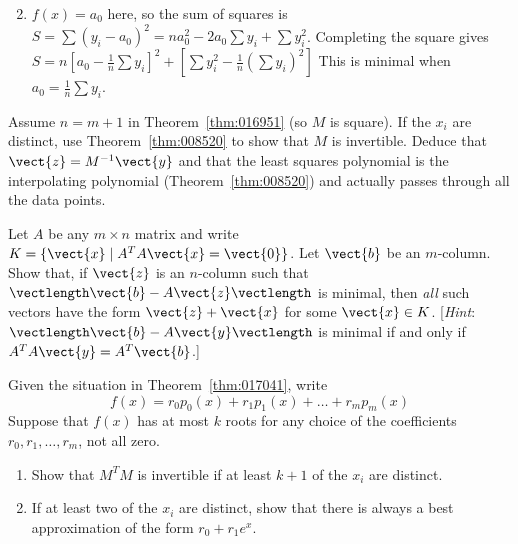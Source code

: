 \begin{multicols}{2}
\begin{ex}
\begin{enumerate}[label={\alph*.}]
\end{enumerate}
\begin{sol}
\begin{enumerate}[label={\alph*.}]
\setcounter{enumi}{1}
\item  $f(x) = a_{0}$ here, so the sum of squares is 
$S = \sum(y_i - a_0)^2 = na_0^2 - 2a_0\sum y_i + \sum y_i^2$. Completing the square gives  $S = n[a_0 - \frac{1}{n}\sum y_i]^2 + [\sum y_i^2 - \frac{1}{n}(\sum y_i)^2]$ This is minimal when $a_0 = \frac{1}{n}\sum y_i$.
\end{enumerate}
\end{sol}
\end{ex}

\begin{ex}
Assume $n = m + 1$ in Theorem~\ref{thm:016951} (so $M$ is square). If the $x_{i}$ are distinct, use Theorem~\ref{thm:008520} to show that $M$ is invertible. Deduce that $\vect{z} = M^{-1}\vect{y}$ and that the least squares polynomial is the interpolating polynomial (Theorem~\ref{thm:008520}) and actually passes through all the data points.
\end{ex}

\begin{ex}
Let $A$ be any $m \times n$ matrix and write $K = \{\vect{x} \mid A^{T}A\vect{x} = \vect{0}\}$. Let $\vect{b}$ be an $m$-column. Show that, if $\vect{z}$ is an $n$-column such that $\vectlength\vect{b} - A\vect{z}\vectlength$ is minimal, then \textit{all} such vectors have the form $\vect{z} + \vect{x}$ for some $\vect{x} \in K$. [\textit{Hint}: $\vectlength\vect{b} - A\vect{y}\vectlength$ is minimal if and only if $A^{T}A\vect{y} = A^{T}\vect{b}$.]
\end{ex}

\begin{ex}
Given the situation in Theorem~\ref{thm:017041}, write
\begin{equation*}
f(x) = r_0p_0(x) + r_1p_1(x) + \dots + r_mp_m(x)
\end{equation*}
Suppose that $f(x)$ has at most $k$ roots for any choice of the coefficients $r_{0}, r_{1}, \dots, r_{m}$, not all zero.

\begin{enumerate}[label={\alph*.}]
\item Show that $M^{T}M$ is invertible if at least $k + 1$ of the $x_{i}$ are distinct.

\item If at least two of the $x_{i}$ are distinct, show that there is always a best approximation of the form $r_{0} + r_{1}e^{x}$.


\end{enumerate}
\end{ex}
\end{multicols}
